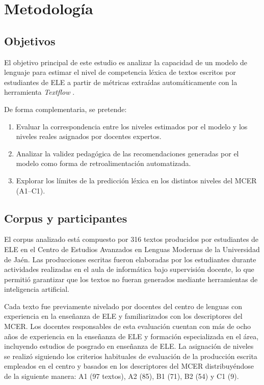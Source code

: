 \documentclass[spanish]{textolivre}
\begin{document}
\section{Metodología}

\subsection{Objetivos}

El objetivo principal de este estudio es analizar la capacidad de un modelo de lenguaje \cite{google2025gemini} para estimar el nivel de competencia léxica de textos escritos por estudiantes de ELE a partir de métricas extraídas automáticamente con la herramienta \textit{Textflow} \cite{sinai_textflow2025}.

De forma complementaria, se pretende:

\begin{enumerate}
    \item Evaluar la correspondencia entre los niveles estimados por el modelo y los niveles reales asignados por docentes expertos.
    \item Analizar la validez pedagógica de las recomendaciones generadas por el modelo como forma de retroalimentación automatizada.
    \item Explorar los límites de la predicción léxica en los distintos niveles del MCER (A1–C1).
\end{enumerate}

\subsection{Corpus y participantes}\label{corpus}

El corpus analizado está compuesto por 316 textos producidos por estudiantes de ELE en el Centro de Estudios Avanzados en Lenguas Modernas de la Universidad de Jaén. Las producciones escritas fueron elaboradas por los estudiantes durante actividades realizadas en el aula de informática bajo supervisión docente, lo que permitió garantizar que los textos no fueran generados mediante herramientas de inteligencia artificial.

Cada texto fue previamente nivelado por docentes del centro de lenguas con experiencia en la enseñanza de ELE y familiarizados con los descriptores del MCER. Los docentes responsables de esta evaluación cuentan con más de ocho años de experiencia en la enseñanza de ELE y formación especializada en el área, incluyendo estudios de posgrado en enseñanza de ELE. La asignación de niveles se realizó siguiendo los criterios habituales de evaluación de la producción escrita empleados en el centro y basados en los descriptores del MCER distribuyéndose de la siguiente manera: A1 (97 textos), A2 (85), B1 (71), B2 (54) y C1 (9).
\end{document}
